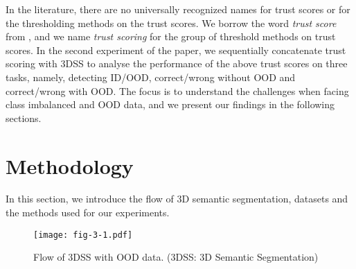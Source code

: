 \documentclass[journal]{IEEEtran}
\begin{document}
In the literature, there are no universally recognized names for trust scores or for the thresholding methods on the trust scores.
We borrow the word {\it trust score} from \cite{jiang2018trust}, and we name {\it trust scoring} for the group of threshold methods on trust scores.
In the second experiment of the paper, we sequentially concatenate trust scoring with 3DSS to analyse the performance of the above trust scores on three tasks, namely, detecting ID/OOD, correct/wrong without OOD and correct/wrong with OOD. The focus is to understand the challenges when facing class imbalanced and OOD data, and we present our findings in the following sections.

%

\section{Methodology} \label{sec:3}
In this section, we introduce the flow of 3D semantic segmentation, datasets and the methods used for our experiments.

\begin{figure}[t]
	\centering
	\texttt{[image: fig-3-1.pdf]}
	\vspace{-3mm}
	\caption{Flow of 3DSS with OOD data. (3DSS: 3D Semantic Segmentation)}
	\label{fig:flow}
	\vspace{-4mm}
\end{figure}
\end{document}
